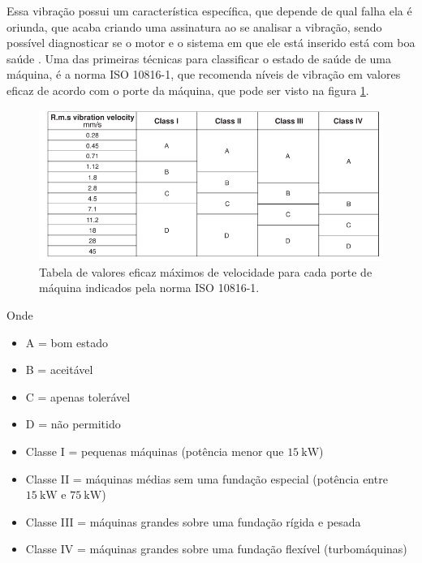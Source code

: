 Essa vibração possui um característica específica, que depende de qual falha ela é oriunda, que acaba criando uma assinatura
ao se analisar a vibração, sendo possível diagnosticar se o motor e o sistema em que ele está inserido está com boa saúde \cite{Wu2013}.
Uma das primeiras técnicas para classificar o estado de saúde de uma máquina, é a norma ISO 10816-1, que recomenda níveis de vibração 
em valores eficaz de acordo com o porte da máquina, que pode ser visto na figura \ref{fig:iso10816-1_randall_p146}.

\begin{figure}[H]
    \caption{Tabela de valores eficaz máximos de velocidade para cada porte de máquina indicados pela norma ISO 10816-1.}
    \begin{center}
        \includegraphics[scale=.5]{referencial/img/iso10816-1_randall_p146.png}
    \end{center}
    \label{fig:iso10816-1_randall_p146}
\end{figure}

Onde

\begin{itemize}
    \item A = bom estado
    \item B = aceitável
    \item C = apenas tolerável
    \item D = não permitido
    \item Classe I = pequenas máquinas (potência menor que $\SI{15}{\kilo\watt}$)
    \item Classe II = máquinas médias sem uma fundação especial (potência entre $\SI{15}{\kilo\watt}$ e $\SI{75}{\kilo\watt}$)
    \item Classe III = máquinas grandes sobre uma fundação rígida e pesada
    \item Classe IV = máquinas grandes sobre uma fundação flexível (turbomáquinas) 
\end{itemize}

